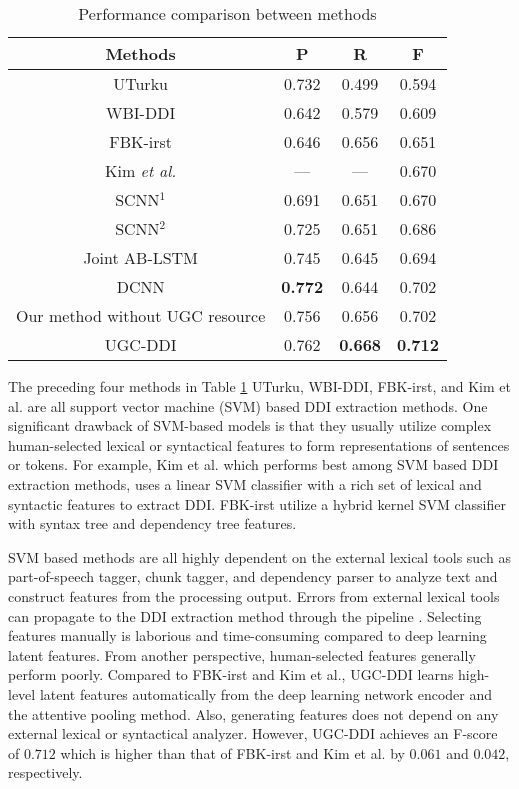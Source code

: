 \documentclass[conference]{IEEEtran}
\begin{document}
\begin{table}
\caption{Performance comparison between methods}
\label{table:comp}
\centering
\begin{tabular}{cccc}
\hline
 Methods & P & R & F \\ \hline
 UTurku \cite{bjorne_uturku:_2013} & 0.732 &  0.499 &  0.594\\
 WBI-DDI \cite{thomas_wbi-ddi:_2013} & 0.642 &  0.579 &  0.609 \\
 FBK-irst \cite{chowdhury_fbk-irst:_2013} &  0.646 & 0.656 & 0.651\\
 Kim \emph{et al.} \cite{kim_extracting_2015} & --- & --- &  0.670\\
  SCNN$^1$ \cite{zhao_drug_2016} &  0.691 & 0.651 & 0.670\\
 SCNN$^2$ \cite{zhao_drug_2016} &  0.725 & 0.651 & 0.686\\
 Joint AB-LSTM \cite{sahu_drug-drug_2017} &  0.745 & 0.645 & 0.694\\
 DCNN \cite{liu_dependency-based_2016} & \textbf{0.772} & 0.644 & 0.702 \\
 Our method without UGC resource & 0.756 & 0.656 & 0.702 \\
 UGC-DDI & 0.762 & \textbf{0.668} & \textbf{0.712} \\\hline
\end{tabular}
\end{table}

The preceding four methods in Table \ref{table:comp} UTurku, WBI-DDI, FBK-irst, and Kim et al. are all support vector machine (SVM) based DDI extraction methods.
One significant drawback of SVM-based models is that they usually utilize complex human-selected lexical or
syntactical features to form representations of sentences or tokens.
For example, Kim et al. which performs best among SVM based DDI extraction methods, uses a linear SVM classifier
with a rich set of lexical and syntactic features to extract DDI.
FBK-irst utilize a hybrid kernel SVM classifier with syntax tree and dependency tree features.

SVM based methods are all highly dependent on the external lexical tools such as part-of-speech tagger,
chunk tagger, and dependency parser to analyze text and construct features from the processing output.
Errors from external lexical tools can propagate to the DDI extraction method through the pipeline \cite{jiao_chinese_2018}.
Selecting features manually is laborious and time-consuming compared to deep learning latent features.
From another perspective, human-selected features generally perform poorly.
Compared to FBK-irst and Kim et al., UGC-DDI learns high-level latent features automatically from the deep learning network encoder
and the attentive pooling method.
Also, generating features does not depend on any external lexical or syntactical analyzer.
However, UGC-DDI achieves an F-score of $0.712$ which is higher than that of FBK-irst and Kim et al. by $0.061$ and $0.042$, respectively.
\end{document}
